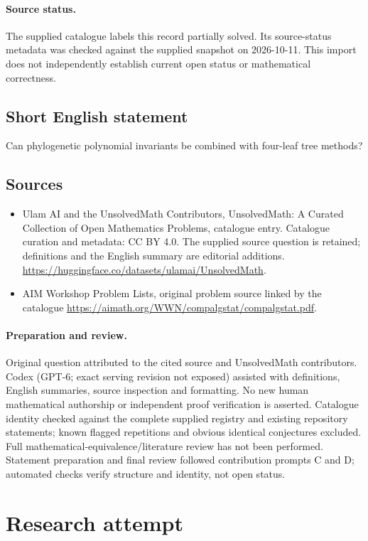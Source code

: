 \documentclass[11pt]{article}
\begin{document}
\paragraph{Source status.}
The supplied catalogue labels this record partially solved. Its source-status metadata was checked against the supplied snapshot on 2026-10-11. This import does not independently establish current open status or mathematical correctness.
\subsection{Short English statement}
Can phylogenetic polynomial invariants be combined with four-leaf tree methods?
\subsection{Sources}
\begin{itemize}
\item[S1] Ulam AI and the UnsolvedMath Contributors, UnsolvedMath: A Curated Collection of Open Mathematics Problems, catalogue entry. Catalogue curation and metadata: CC BY 4.0. The supplied source question is retained; definitions and the English summary are editorial additions.
\url{https://huggingface.co/datasets/ulamai/UnsolvedMath}.
\item[S2] AIM Workshop Problem Lists, original problem source linked by the catalogue
\url{https://aimath.org/WWN/compalgstat/compalgstat.pdf}.
\end{itemize}
\paragraph{Preparation and review.}
Original question attributed to the cited source and UnsolvedMath contributors. Codex (GPT-6; exact serving revision not exposed) assisted with definitions, English summaries, source inspection and formatting. No new human mathematical authorship or independent proof verification is asserted. Catalogue identity checked against the complete supplied registry and existing repository statements; known flagged repetitions and obvious identical conjectures excluded. Full mathematical-equivalence/literature review has not been performed. Statement preparation and final review followed contribution prompts C and D; automated checks verify structure and identity, not open status.
\label{end:statement}


\section{Research attempt}
\end{document}
